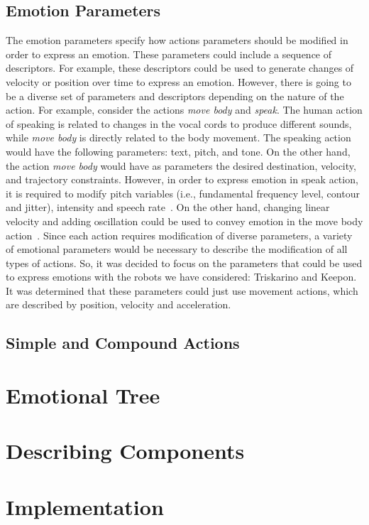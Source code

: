 \documentclass[letterpaper, 10 pt, conference]{ieeeconf}  %
\begin{document}
\subsection{Emotion Parameters}
The emotion parameters specify how actions parameters should be modified in order to express an emotion. These parameters could include a sequence of descriptors. For example, these descriptors could be used to generate changes of velocity or position over time to express an emotion. However, there is going to be a diverse set of parameters and descriptors depending on the nature of the action. For example, consider the actions \textit{move body} and \textit{speak}. The human action of speaking is related to changes in the vocal cords to produce different sounds, while \textit{move body} is directly related to the body movement. The speaking action would have the following parameters: text, pitch, and tone. On the other hand, the action \textit{move body} would have as parameters the desired destination, velocity, and trajectory constraints. However, in order to express emotion in speak action, it is required to modify pitch variables (i.e., fundamental frequency level, contour and jitter), intensity and speech rate~\cite{Gunes2011}. On the other hand, changing linear velocity and adding oscillation could be used to convey emotion in the move body action~\cite{Angel2016c}. Since each action requires modification of diverse parameters, a variety of emotional parameters would be necessary to describe the modification of all types of actions. So, it was decided to focus on the parameters that could be used to express emotions with the robots we have considered: Triskarino and Keepon. It was determined that these parameters could just use movement actions, which are described by position, velocity and acceleration.    
\subsection{Simple and Compound Actions}
 
\section{Emotional Tree}
\label{sec:emotional_execution_tree}

\section{Describing Components}
\label{sec:description}

\section{Implementation}
\label{sec:implementation}

\end{document}
